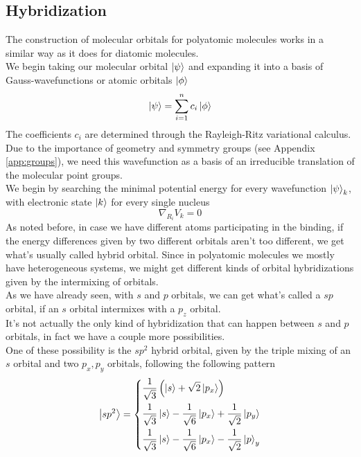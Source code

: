 \documentclass[../qm.tex]{subfiles}
\begin{document}
	\subsection{Hybridization}
	The construction of molecular orbitals for polyatomic molecules works in a similar way as it does for diatomic molecules.\\
	We begin taking our molecular orbital $\ket{\psi}$ and expanding it into a basis of Gauss-wavefunctions or atomic orbitals $\ket{\phi}$
	\begin{equation*}
		\ket{\psi}=\sum_{i=1}^nc_i\ket{\phi}
	\end{equation*}
	The coefficients $c_i$ are determined through the Rayleigh-Ritz variational calculus. Due to the importance of geometry and symmetry groups (see Appendix \ref{app:groups}), we need this wavefunction as a basis of an irreducible translation of the molecular point groups.\\
	We begin by searching the minimal potential energy for every wavefunction $\ket{\psi}_k$, with electronic state $\ket{k}$ for every single nucleus
	\begin{equation*}
		\nabla_{R_i}V_k=0
	\end{equation*}
	As noted before, in case we have different atoms participating in the binding, if the energy differences given by two different orbitals aren't too different, we get what's usually called hybrid orbital. Since in polyatomic molecules we mostly have heterogeneous systems, we might get different kinds of orbital hybridizations given by the intermixing of orbitals.\\
	As we have already seen, with $s$ and $p$ orbitals, we can get what's called a $sp$ orbital, if an $s$ orbital intermixes with a $p_z$ orbital.\\
	It's not actually the only kind of hybridization that can happen between $s$ and $p$ orbitals, in fact we have a couple more possibilities.\\
	One of these possibility is the $sp^2$ hybrid orbital, given by the triple mixing of an $s$ orbital and two $p_x,p_y$ orbitals, following the following pattern
	\begin{equation}
		\ket{sp^2}=\left\{\begin{aligned}
				&\frac{1}{\sqrt{3}}\left( \ket{s}+\sqrt{2}\ket{p_x} \right)\\
				&\frac{1}{\sqrt{3}}\ket{s}-\frac{1}{\sqrt{6}}\ket{p_x}+\frac{1}{\sqrt{2}}\ket{p_y}\\
				&\frac{1}{\sqrt{3}}\ket{s}-\frac{1}{\sqrt{6}}\ket{p_x}-\frac{1}{\sqrt{2}}\ket{p}_y
		\end{aligned}\right.
		\label{eq:sp2hybridization}
	\end{equation}
\end{document}
